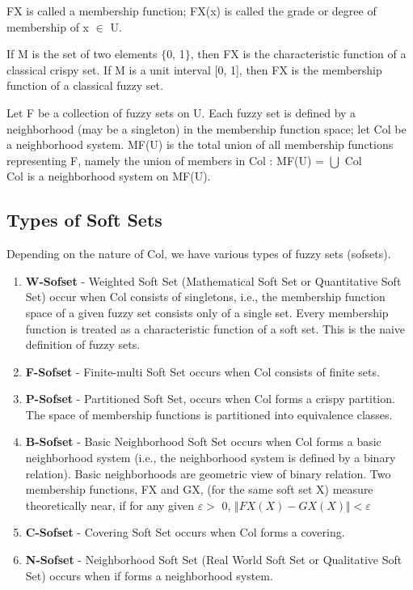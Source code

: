 \documentclass[12pt]{article} %
\begin{document}
FX is called a membership function; FX(x) is called the grade or degree of membership of x \begin{math} \in \end{math} U. 

If M is the set of two elements $\{$0, 1$\}$, then FX is the
characteristic function of a classical crispy set. If M is a
unit interval [0, 1], then FX is the membership function of a
classical fuzzy set.

Let F be a collection of fuzzy sets on U. Each fuzzy set is defined by a neighborhood (may be a singleton) in the membership function space; let Col be a neighborhood system. MF(U) is the total union of all membership functions representing F, namely the union of members in Col :
MF(U) = \begin{math} \bigcup \end{math} Col \\
Col is a neighborhood system on MF(U).


\subsection{Types of Soft Sets}
Depending on the nature of Col, we have various types of fuzzy sets (sofsets).
\begin{enumerate}
\item{\textbf{W-Sofset} - Weighted Soft Set (Mathematical Soft
Set or Quantitative Soft Set) occur when Col consists of singletons, i.e., the membership function space of a given fuzzy set consists only of a single set. Every membership function is treated as a characteristic function of a soft set. This is the naive definition of fuzzy sets.}
\item{\textbf{F-Sofset} - Finite-multi Soft Set occurs when Col consists of
finite sets.}
\item{\textbf{P-Sofset} - Partitioned Soft Set, occurs when Col forms a crispy
partition. The space of membership functions is partitioned into
equivalence classes.}
\item{\textbf{B-Sofset} - Basic Neighborhood Soft Set occurs when Col
forms a basic neighborhood system (i.e., the
neighborhood system is defined by a binary relation). Basic neighborhoods are geometric view of binary relation. Two membership functions, FX and GX, (for the same soft set X) measure theoretically near, if for any given $\varepsilon >$ 0,
$\Vert FX(X) - GX(X) \Vert < \varepsilon$
}

\item{\textbf{C-Sofset} - Covering Soft Set occurs when Col forms a
covering.}

\item{\textbf{N-Sofset} - Neighborhood Soft Set (Real World Soft
Set or Qualitative Soft Set) occurs when if forms a
neighborhood system.}

\end{enumerate}
\end{document}
